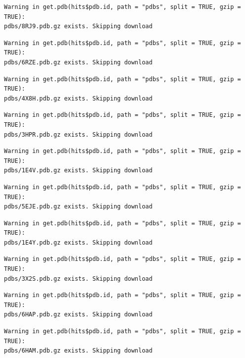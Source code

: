 \documentclass[
  letterpaper,
  DIV=11,
  numbers=noendperiod]{scrartcl}
\begin{document}
\begin{verbatim}
Warning in get.pdb(hits$pdb.id, path = "pdbs", split = TRUE, gzip = TRUE):
pdbs/8RJ9.pdb.gz exists. Skipping download
\end{verbatim}

\begin{verbatim}
Warning in get.pdb(hits$pdb.id, path = "pdbs", split = TRUE, gzip = TRUE):
pdbs/6RZE.pdb.gz exists. Skipping download
\end{verbatim}

\begin{verbatim}
Warning in get.pdb(hits$pdb.id, path = "pdbs", split = TRUE, gzip = TRUE):
pdbs/4X8H.pdb.gz exists. Skipping download
\end{verbatim}

\begin{verbatim}
Warning in get.pdb(hits$pdb.id, path = "pdbs", split = TRUE, gzip = TRUE):
pdbs/3HPR.pdb.gz exists. Skipping download
\end{verbatim}

\begin{verbatim}
Warning in get.pdb(hits$pdb.id, path = "pdbs", split = TRUE, gzip = TRUE):
pdbs/1E4V.pdb.gz exists. Skipping download
\end{verbatim}

\begin{verbatim}
Warning in get.pdb(hits$pdb.id, path = "pdbs", split = TRUE, gzip = TRUE):
pdbs/5EJE.pdb.gz exists. Skipping download
\end{verbatim}

\begin{verbatim}
Warning in get.pdb(hits$pdb.id, path = "pdbs", split = TRUE, gzip = TRUE):
pdbs/1E4Y.pdb.gz exists. Skipping download
\end{verbatim}

\begin{verbatim}
Warning in get.pdb(hits$pdb.id, path = "pdbs", split = TRUE, gzip = TRUE):
pdbs/3X2S.pdb.gz exists. Skipping download
\end{verbatim}

\begin{verbatim}
Warning in get.pdb(hits$pdb.id, path = "pdbs", split = TRUE, gzip = TRUE):
pdbs/6HAP.pdb.gz exists. Skipping download
\end{verbatim}

\begin{verbatim}
Warning in get.pdb(hits$pdb.id, path = "pdbs", split = TRUE, gzip = TRUE):
pdbs/6HAM.pdb.gz exists. Skipping download
\end{verbatim}
\end{document}
